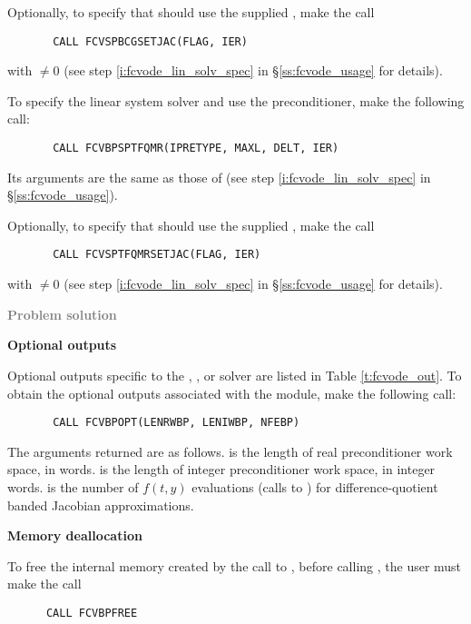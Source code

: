 \begin{Steps}
  Optionally, to specify that {\spbcg} should use the supplied , 
  make the call
\begin{verbatim}
       CALL FCVSPBCGSETJAC(FLAG, IER)
\end{verbatim}
  with  $\neq 0$ 
  (see step \ref{i:fcvode_lin_solv_spec} in \S\ref{ss:fcvode_usage} for details).


  To specify the {\spbcg} linear system solver and use the {\cvbandpre}
  preconditioner, make the following call:
\begin{verbatim}
       CALL FCVBPSPTFQMR(IPRETYPE, MAXL, DELT, IER)
\end{verbatim}
  Its arguments are the same as those of 
  (see step \ref{i:fcvode_lin_solv_spec} in \S\ref{ss:fcvode_usage}).
  
  Optionally, to specify that {\sptfqmr} should use the supplied , 
  make the call
\begin{verbatim}
       CALL FCVSPTFQMRSETJAC(FLAG, IER)
\end{verbatim}
  with  $\neq 0$ 
  (see step \ref{i:fcvode_lin_solv_spec} in \S\ref{ss:fcvode_usage} for details).


\item \textcolor{gray}{\bf Problem solution}
  
\item {\bf {\cvbandpre} Optional outputs}
  
  Optional outputs specific to the {\spgmr}, {\spbcg}, or {\sptfqmr} solver are 
  listed in Table \ref{t:fcvode_out}.
  To obtain the optional outputs associated with the {\cvbandpre} module, make
  the following call:
\begin{verbatim}
       CALL FCVBPOPT(LENRWBP, LENIWBP, NFEBP)
\end{verbatim}
  The arguments returned are as follows.
   is the length of real preconditioner work space, in 
  words.  is the length of integer preconditioner work space, in
  integer words.  is the number of $f(t,y)$ evaluations (calls to
  ) for difference-quotient banded Jacobian approximations.
  
\item {\bf Memory deallocation}

  To free the internal memory created by the call to , before
  calling , the user must make the call
\begin{verbatim}
      CALL FCVBPFREE
\end{verbatim}

\end{Steps}


